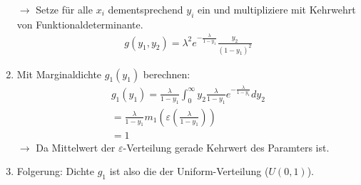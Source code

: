 \documentclass{article}
\begin{document}
\begin{enumerate}
		$\longrightarrow$ Setze für alle $x_i$ dementsprechend $y_i$ ein und multipliziere
		mit Kehrwehrt von Funktionaldeterminante.
		\begin{align}
			g(y_1,y_2) = \lambda^2e^{-\frac{\lambda}{1 - y_1}}\frac{y_2}{(1-y_1)^2}
		\end{align}
	\item Mit Marginaldichte $g_1(y_1)$ berechnen:\\
		\begin{align}
			g_1(y_1) = \frac{\lambda}{1 - y_1} \int^\infty_0 y_2\frac{\lambda}{1 - y_1}
			e^{-\frac{\lambda}{1 - y_1}} dy_2\\
			= \frac{\lambda}{1 - y_1} m_1 (\varepsilon(\frac{\lambda}{1 - y_1}))\\
			= 1
		\end{align}
		$\longrightarrow$ Da Mittelwert der $\varepsilon$-Verteilung gerade Kehrwert des
		Paramters ist.
	\item Folgerung: Dichte $g_1$ ist also die der Uniform-Verteilung ($U(0,1)$).
\end{enumerate}
\end{document}
